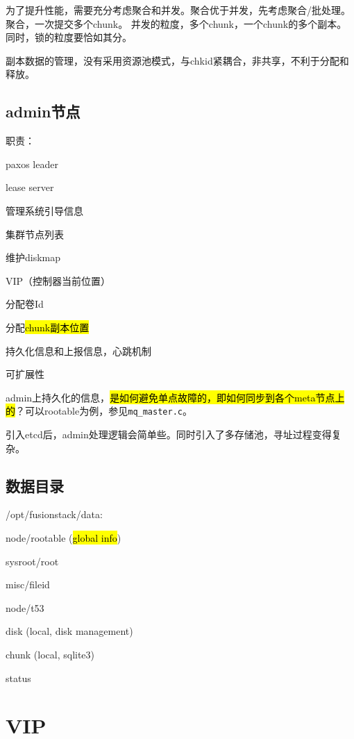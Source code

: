 为了提升性能，需要充分考虑聚合和并发。聚合优于并发，先考虑聚合/批处理。
聚合，一次提交多个chunk。
并发的粒度，多个chunk，一个chunk的多个副本。同时，锁的粒度要恰如其分。

副本数据的管理，没有采用资源池模式，与chkid紧耦合，非共享，不利于分配和释放。

\subsection{admin节点}

职责：
\begin{compactenum}
\item paxos leader
\item lease server
\item 管理系统引导信息
\item 集群节点列表
\item 维护diskmap
\item VIP（控制器当前位置）
\item 分配卷Id
\item 分配\hl{chunk副本位置}
\end{compactenum}

持久化信息和上报信息，心跳机制

可扩展性

admin上持久化的信息，\hl{是如何避免单点故障的，即如何同步到各个meta节点上的}？可以rootable为例，参见\verb|mq_master.c|。

引入etcd后，admin处理逻辑会简单些。同时引入了多存储池，寻址过程变得复杂。

\subsection{数据目录}

/opt/fusionstack/data:
\begin{itembox}
\item node/rootable (\hl{global info})
    \begin{compactitem}
    \item sysroot/root
    \item misc/fileid
    \item node/t53
    \end{compactitem}
\item disk (local, disk management)
\item chunk (local, sqlite3)
\item status
\end{itembox}

\section{VIP}

